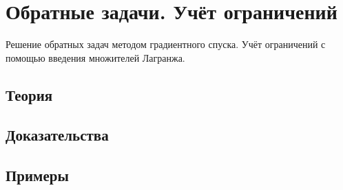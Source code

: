 
\section{Обратные задачи. Учёт ограничений}
\label{sec:2.4.18-inverse-problems}

\begin{ticket}
Решение обратных задач методом градиентного спуска. Учёт ограничений с помощью введения множителей Лагранжа.
\end{ticket}

\subsection*{Теория}

\subsection*{Доказательства}

\subsection*{Примеры}
